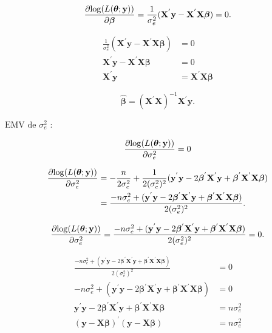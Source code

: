 \documentclass[12pt, oldfontcommands]{article}\usepackage[]{graphicx}\usepackage[]{color}
\begin{document}
\[ \frac{\partial
   {\rm log}(L(\bm{\theta}; \mathbf{y}))}{\partial \bm{\beta}} =
   \frac{1}{\sigma_{e}^{2}}
   (\mathbf{X}^{'}\mathbf{y} - \mathbf{X}^{'}\mathbf{X}\bm{\beta}) = 0.
\]

\begin{align*}
 \frac{1}{\sigma_{e}^{2}}
 (\mathbf{X}^{'}\mathbf{y} - \mathbf{X}^{'}\mathbf{X}\bm{\beta}) & = 0 
 \\ \mathbf{X}^{'}\mathbf{y} - \mathbf{X}^{'}\mathbf{X}\bm{\beta} & = 0
 \\ \mathbf{X}^{'}\mathbf{y} & = \mathbf{X}^{'}\mathbf{X}\bm{\beta}
\end{align*}

\[\boxed{\hat{\bm{\beta}} =
         (\mathbf{X}^{'}\mathbf{X})^{-1}\mathbf{X}^{'}\mathbf{y}.} \]

\(\boxed{\text{EMV de } \sigma_{e}^{2}}\) :

\[ \frac{\partial
   {\rm log}(L(\bm{\theta}; \mathbf{y}))}{\partial \sigma_{e}^{2}} = 0
\]

\begin{align*}
 \frac{\partial
 {\rm log}(L(\bm{\theta}; \mathbf{y}))}{\partial \sigma_{e}^{2}} & =
 -\frac{n}{2\sigma_{e}^{2}} + \frac{1}{2(\sigma_{e}^{2})^{2}}
 (\mathbf{y}^{'}\mathbf{y} - 2\bm{\beta}^{'}\mathbf{X}^{'}\mathbf{y} +
 \bm{\beta}^{'}\mathbf{X}^{'}\mathbf{X}\bm{\beta}) \\ & =
 \frac{-n\sigma_{e}^{2} + (\mathbf{y}^{'}\mathbf{y} -
 2\bm{\beta}^{'}\mathbf{X}^{'}\mathbf{y} +
 \bm{\beta}^{'}\mathbf{X}^{'}\mathbf{X}\bm{\beta})}{
 2(\sigma_{e}^{2})^{2}}.
\end{align*}

\[ \frac{\partial
   {\rm log}(L(\bm{\theta}; \mathbf{y}))}{\partial \sigma_{e}^{2}} =
   \frac{-n\sigma_{e}^{2} + (\mathbf{y}^{'}\mathbf{y} -
   2\bm{\beta}^{'}\mathbf{X}^{'}\mathbf{y} +
   \bm{\beta}^{'}\mathbf{X}^{'}\mathbf{X}\bm{\beta})}{
   2(\sigma_{e}^{2})^{2}} = 0. \]

\begin{align*}
 \frac{-n\sigma_{e}^{2} + (\mathbf{y}^{'}\mathbf{y} -
 2\bm{\beta}^{'}\mathbf{X}^{'}\mathbf{y} +
 \bm{\beta}^{'}\mathbf{X}^{'}\mathbf{X}\bm{\beta})}{
 2(\sigma_{e}^{2})^{2}} & = 0 \\
 -n\sigma_{e}^{2} + (\mathbf{y}^{'}\mathbf{y} -
 2\bm{\beta}^{'}\mathbf{X}^{'}\mathbf{y} +
 \bm{\beta}^{'}\mathbf{X}^{'}\mathbf{X}\bm{\beta}) & = 0
 \\ \mathbf{y}^{'}\mathbf{y} - 2\bm{\beta}^{'}\mathbf{X}^{'}\mathbf{y} +
 \bm{\beta}^{'}\mathbf{X}^{'}\mathbf{X}\bm{\beta} & = n\sigma_{e}^{2} \\
 (\mathbf{y} - \mathbf{X} \bm{\beta})^{'}
 (\mathbf{y} - \mathbf{X} \bm{\beta}) & = n\sigma_{e}^{2}
\end{align*}
\end{document}
